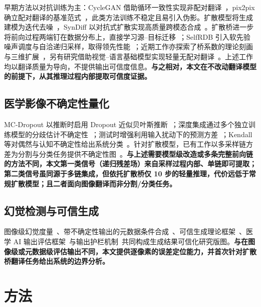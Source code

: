 \documentclass[11pt,a4paper]{ctexart}
\begin{document}
早期方法以对抗训练为主：CycleGAN 借助循环一致性实现非配对翻译~\cite{zhu2017cyclegan}，pix2pix 确立配对翻译的基准范式~\cite{isola2017pix2pix}，此类方法训练不稳定且易引入伪影。扩散模型将生成建模为迭代去噪~\cite{ho2020ddpm,nichol2021iddpm}，SynDiff 以对抗式扩散实现高质量跨模态合成~\cite{ozbey2023syndiff}。扩散桥进一步将前向过程两端钉在数据分布上，直接学习源--目标迁移~\cite{liu2023i2sb,chung2023directbridge,su2023ddib}；SelfRDB 引入软先验噪声调度与自洽递归采样，取得领先性能~\cite{arslan2025selfrdb}；近期工作亦探索了桥系数的理论刻画与三维扩展~\cite{kim2024nsb,zhang2025bridge3d}，另有研究借助视觉--语言基础模型实现轻量无配对翻译~\cite{korkmaz2025i2igalip}。上述工作均以翻译质量为导向，不提供输出可信度信息。\textbf{与之相对，本文在不改动翻译模型的前提下，从其推理过程内部提取可信度证据。}

\subsection{医学影像不确定性量化}

MC-Dropout 以推断时启用 Dropout 近似贝叶斯推断~\cite{gal2016mcdropout}；深度集成通过多个独立训练模型的分歧估计不确定性~\cite{lakshminarayanan2017ensembles}；测试时增强利用输入扰动下的预测方差~\cite{ayhan2018tta}；Kendall 等对偶然与认知不确定性给出系统分类~\cite{kendall2017uncertainties}。针对扩散模型，已有工作以多采样链方差为分割与分类任务提供不确定性图~\cite{wolleb2022diffusionensembles,osuna2024microscopy}。\textbf{与上述需要模型级改造或多条完整前向链的方法不同，本文第一类信号（递归残差场）来自采样过程内部、单链即可提取；第二类信号虽同源于多链集成，但依托扩散桥仅 10 步的轻量推理，代价远低于常规扩散模型；且二者面向图像翻译而非分割/分类任务。}

\subsection{幻觉检测与可信生成}

图像级幻觉度量~\cite{tivnan2024hallucinationindex}、带不确定性输出的元数据条件合成~\cite{oliveras2026mumins}、可信生成理论框架~\cite{jin2026trustworthy}、医学 AI 输出评估框架~\cite{fink2026airads}与输出护栏机制~\cite{cardoso2023raise}共同构成生成结果可信化研究版图。\textbf{与在图像级或元数据级评估输出不同，本文提供逐像素的误差定位能力，并首次针对扩散桥翻译任务给出系统的边界分析。}

\section{方法}
\end{document}
